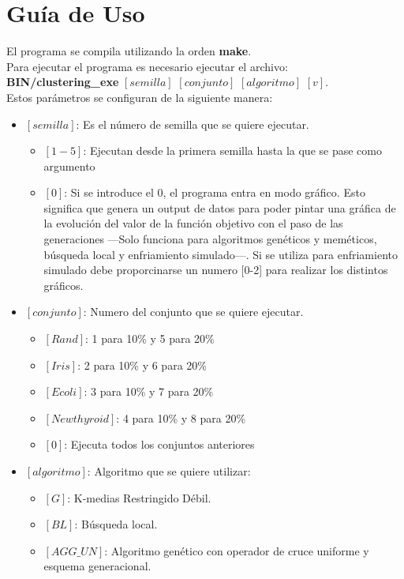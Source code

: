 \newpage
\section{Guía de Uso}
El programa se compila utilizando la orden \textbf{make}.\\
Para ejecutar el programa es necesario ejecutar el archivo:\\
 \textbf{BIN/clustering\_exe} $[semilla]$ $[conjunto]$ $[algoritmo]$ $[v]$.\\
Estos parámetros se configuran de la siguiente manera:
\begin{itemize}
   \item $[semilla]$: Es el número de semilla que se quiere ejecutar.
   \begin{itemize}
      \item $[1-5]$: Ejecutan desde la primera semilla hasta la que se pase como argumento
      \item $[0]$: Si se introduce el 0, el programa entra en modo gráfico. Esto significa que genera un output de datos para poder pintar una gráfica de la evolución del valor de la función objetivo con el paso de las generaciones ---Solo funciona para algoritmos genéticos y meméticos, búsqueda local y enfriamiento simulado---.
      Si se utiliza para enfriamiento simulado debe proporcinarse un numero [0-2] para realizar los distintos gráficos.
   \end{itemize}
   \item $[conjunto]$: Numero del conjunto que se quiere ejecutar.
   \begin{itemize}
      \item $[Rand]$: 1 para 10\% y 5 para 20\%
      \item $[Iris]$: 2 para 10\% y 6 para 20\%
      \item $[Ecoli]$: 3 para 10\% y 7 para 20\%
      \item $[Newthyroid]$: 4 para 10\% y 8 para 20\%
      \item $[0]$: Ejecuta todos los conjuntos anteriores
   \end{itemize}
   \item $[algoritmo]$: Algoritmo que se quiere utilizar:
   \begin{itemize}
      \item $[G]$: K-medias Restringido Débil.
      \item $[BL]$: Búsqueda local.
      \item $[AGG\_UN]$: Algoritmo genético con operador de cruce uniforme y esquema generacional.

\end{itemize}
\end{itemize}
